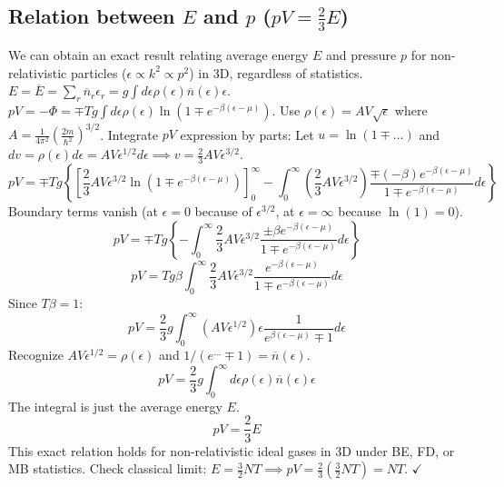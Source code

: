 \documentclass[11pt]{article}
\newcommand{\avg}[1]{\overline{#1}}
\newcommand{\eps}{\epsilon}
\newcommand{\nbar}{\overline{n}} %
\begin{document}
\subsection*{Relation between $E$ and $p$ ($pV = \frac{2}{3} E$)}

We can obtain an exact result relating average energy $E$ and pressure $p$ for non-relativistic particles ($\eps \propto k^2 \propto p^2$) in 3D, regardless of statistics.
$E = \avg{E} = \sum_r \nbar_r \eps_r = g \int d\eps \rho(\eps) \nbar(\eps) \eps$.
$pV = -\Phi = \mp T g \int d\eps \rho(\eps) \ln(1 \mp e^{-\beta(\eps-\mu)})$.
Use $\rho(\epsilon) = A V \sqrt{\epsilon}$ where $A = \frac{1}{4\pi^2}(\frac{2m}{\hbar^2})^{3/2}$.
Integrate $pV$ expression by parts: Let $u = \ln(1 \mp \dots)$ and $dv = \rho(\epsilon) d\epsilon = AV\epsilon^{1/2} d\epsilon \implies v = \frac{2}{3} AV \epsilon^{3/2}$.
\[ pV = \mp T g \left\{ [ \frac{2}{3}AV\epsilon^{3/2} \ln(1\mp e^{-\beta(\epsilon-\mu)}) ]_0^\infty - \int_0^\infty (\frac{2}{3}AV\epsilon^{3/2}) \frac{\mp (-\beta) e^{-\beta(\epsilon-\mu)}}{1 \mp e^{-\beta(\epsilon-\mu)}} d\epsilon \right\} \]
Boundary terms vanish (at $\epsilon=0$ because of $\epsilon^{3/2}$, at $\epsilon=\infty$ because $\ln(1)=0$).
\[ pV = \mp T g \left\{ - \int_0^\infty \frac{2}{3} AV \epsilon^{3/2} \frac{\pm \beta e^{-\beta(\epsilon-\mu)}}{1 \mp e^{-\beta(\epsilon-\mu)}} d\epsilon \right\} \]
\[ pV = T g \beta \int_0^\infty \frac{2}{3} AV \epsilon^{3/2} \frac{e^{-\beta(\epsilon-\mu)}}{1 \mp e^{-\beta(\epsilon-\mu)}} d\epsilon \]
Since $T\beta = 1$:
\[ pV = \frac{2}{3} g \int_0^\infty (AV\epsilon^{1/2}) \epsilon \frac{1}{e^{\beta(\epsilon-\mu)} \mp 1} d\epsilon \]
Recognize $AV\epsilon^{1/2} = \rho(\epsilon)$ and $1/(e^{\dots}\mp 1) = \nbar(\epsilon)$.
\[ pV = \frac{2}{3} g \int_0^\infty d\epsilon \rho(\epsilon) \nbar(\epsilon) \epsilon \]
The integral is just the average energy $E$.
\[ pV = \frac{2}{3} E \]
This exact relation holds for non-relativistic ideal gases in 3D under BE, FD, or MB statistics.
Check classical limit: $E = \frac{3}{2}NT \implies pV = \frac{2}{3}(\frac{3}{2}NT) = NT$. $\checkmark$
\end{document}
